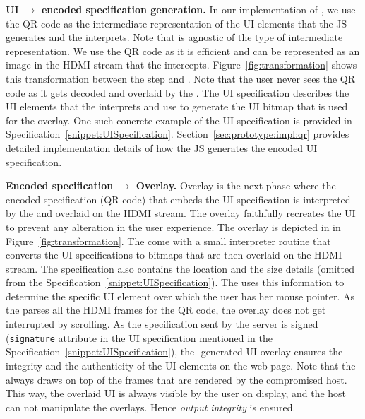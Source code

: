 \begin{mylist}
\item \textbf{UI $\rightarrow$ encoded specification generation.} In our implementation of \name, we use the QR code as the intermediate representation of the UI elements that the \name JS generates and the \device interprets. Note that \name is agnostic of the type of intermediate representation. We use the QR code as it is efficient and can be represented as an image in the HDMI stream that the \device intercepts. Figure~\ref{fig:transformation} shows this transformation between the step \one and \two. Note that the user never sees the QR code as it gets decoded and overlaid by the \device. The UI specification describes the UI elements that the \device interprets and use to generate the UI bitmap that is used for the overlay. One such concrete example of the UI specification is provided in Specification~\ref{snippet:UISpecification}. Section~\ref{sec:prototype:impl:qr} provides detailed implementation details of how the \name JS generates the encoded UI specification. 

\item \textbf{Encoded specification $\rightarrow$ Overlay.} Overlay is the next phase where the encoded specification (QR code) that embeds the UI specification is interpreted by the \device and overlaid on the HDMI stream. The overlay faithfully recreates the UI to prevent any alteration in the user experience. The \device overlay is depicted in \three in Figure~\ref{fig:transformation}. The \device come with a small interpreter routine that converts the UI specifications to bitmaps that are then overlaid on the HDMI stream. The specification also contains the location and the size details (omitted from the Specification~\ref{snippet:UISpecification}). The \device uses this information to determine the specific UI element over which the user has her mouse pointer. As the \device parses all the HDMI frames for the QR code, the overlay does not get interrupted by scrolling. As the specification sent by the server is signed (\texttt{signature} attribute in the UI specification mentioned in the Specification~\ref{snippet:UISpecification}), the \device-generated UI overlay ensures the integrity and the authenticity of the UI elements on the web page. Note that the \device always draws on top of the frames that are rendered by the compromised host. This way, the overlaid UI is always visible by the user on display, and the host can not manipulate the overlays. Hence \emph{output integrity} is ensured.

\end{mylist}

